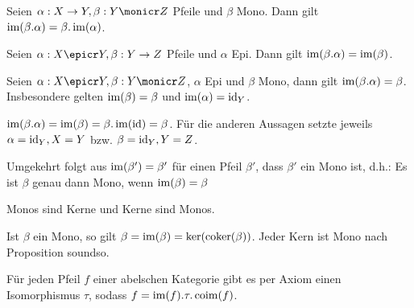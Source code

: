 \begin{prop}
Seien $\alpha : X \to Y, \beta : Y \monicr Z$ Pfeile und $\beta$ Mono.
Dann gilt $\operatorname{im}(\beta.\alpha) = \beta.\operatorname{im}(\alpha)$.
\end{prop}


\begin{prop}
Seien $\alpha : X \epicr Y, \beta : Y \to Z$ Pfeile und $\alpha$ Epi.
Dann gilt $\operatorname{im}(\beta.\alpha) = \operatorname{im}(\beta)$.
\end{prop}

\begin{korr}
Seien $\alpha : X \epicr Y, \beta : Y \monicr Z$, $\alpha$ Epi und $\beta$ Mono, dann gilt $\operatorname{im}(\beta.\alpha) = \beta$. Insbesondere gelten $\operatorname{im}(\beta) = \beta$ und $\operatorname{im}(\alpha) = \operatorname{id}_Y$.
\end{korr}
\begin{bew}
$\operatorname{im}(\beta.\alpha) = \operatorname{im}(\beta) = \beta.\operatorname{im}(\operatorname{id}) = \beta$. Für die anderen Aussagen setzte jeweils $\alpha = \operatorname{id}_Y, X=Y$ bzw. $\beta = \operatorname{id}_Y, Y=Z$.
\end{bew}
\begin{bem}
Umgekehrt folgt aus $\operatorname{im}(\beta') = \beta'$ für einen Pfeil $\beta'$, dass $\beta'$ ein Mono ist, d.h.:
Es ist $\beta$ genau dann Mono, wenn $\operatorname{im}(\beta) = \beta$
\end{bem}

\begin{korr}
Monos sind Kerne und Kerne sind Monos.
\end{korr}
\begin{bew}
Ist $\beta$ ein Mono, so gilt $\beta = \operatorname{im}(\beta) = \ker(\operatorname{coker}(\beta))$.
Jeder Kern ist Mono nach Proposition soundso.
\end{bew}

\begin{bem}
Für jeden Pfeil $f$ einer abelschen Kategorie gibt es per Axiom einen Isomorphismus $\tau$, sodass $f = \operatorname{im}(f).\tau.\operatorname{coim}(f)$.
\end{bem}
